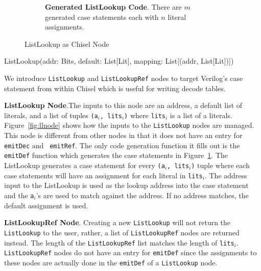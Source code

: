 \begin{figure}[htb]
\begin{subfigure}[t]{0.48\textwidth}
  \caption{{\bf Generated ListLookup Code}. There are $m$ generated
    case statements each with $n$ literal assignments.}
  \label{fig:llv}
  \end{subfigure}
\caption{ListLookup as Chisel Node}
\label{fig:ll}
\end{figure}

\begin{verbbox}
ListLookup(addr: Bits, default: List[Lit], 
                       mapping: List[(addr, List[Lit])])
\end{verbbox}

We introduce {\tt ListLookup} and {\tt ListLookupRef} nodes to target
Verilog's case statement from within Chisel which is useful for
writing decode tables.

\textbf{ListLookup Node}.The inputs to this node are an address, a default list of literals,
and a list of tuples {\tt (a$_i$, lits$_i$)} where {\tt lits$_i$} is a list
of a literals. Figure~\ref{fig:llnode} shows how the inputs to the
{\tt ListLookup} nodes are managed. This node is different from other
nodes in that it does not have an entry for {\tt emitDec} and {\tt
emitRef}. The only code generation function it fills out is the {\tt
emitDef} function which generates the case statements in
Figure~\ref{fig:llv}. The ListLookup generates a case statement for
every {\tt (a$_i$, lits$_i$)} tuple where each case statements will
have an assignment for each literal in {\tt lits$_i$}. The address
input to the ListLookup is used as the lookup address into the case
statement and the {\tt a$_i$}'s are used to match against the
address. If no address matches, the default assignment is used.

\textbf{ListLookupRef Node}. Creating a new {\tt ListLookup} will not return
the {\tt ListLookup} to the user, rather, a list of 
{\tt ListLookupRef} nodes are returned instead. The length of the 
{\tt ListLookupRef} list matches the length of {\tt lits$_i$}. 
{\tt ListLookupRef} nodes do not have an entry for {\tt emitDef} since
the assignments to these nodes are actually done in the {\tt emitDef}
of a {\tt ListLookup} node.


